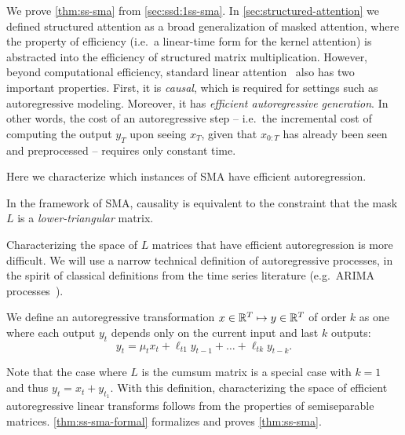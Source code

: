 We prove \cref{thm:ss-sma} from \cref{sec:ssd:1ss-sma}.
In \cref{sec:structured-attention} we defined structured attention as a broad generalization of masked attention,
where the property of efficiency (i.e.\ a linear-time form for the kernel attention) is abstracted into the efficiency of structured matrix multiplication.
However, beyond computational efficiency, standard linear attention~\citep{katharopoulos2020transformers} also has two important properties.
First, it is \emph{causal}, which is required for settings such as autoregressive modeling.
Moreover, it has \emph{efficient autoregressive generation}.
In other words, the cost of an autoregressive step -- i.e.\ the incremental cost of computing the output $y_T$ upon seeing $x_T$, given that $x_{0:T}$ has already been seen and preprocessed --
requires only constant time.

Here we characterize which instances of SMA have efficient autoregression.

In the framework of SMA,
causality is equivalent to the constraint that the mask $L$ is a \emph{lower-triangular} matrix.

Characterizing the space of $L$ matrices that have efficient autoregression is more difficult.
We will use a narrow technical definition of autoregressive processes, in the spirit of classical definitions from the time series literature (e.g.\ ARIMA processes~\citep{box2015time}).%
\begin{definition}
We define an autoregressive transformation $x \in \mathbb{R}^T \mapsto y \in \mathbb{R}^T$ of order $k$ as one where each output $y_t$ depends only on the current input and last $k$ outputs:
\begin{equation}
  \label{eq:efficient-ar}
  y_t = \mu_t x_t + \ell_{t1} y_{t-1} + \dots + \ell_{tk} y_{t-k}.
\end{equation}
\end{definition}
Note that the case where $L$ is the cumsum matrix is a special case with $k=1$ and thus $y_t = x_t + y_{t_1}$.
With this definition, characterizing the space of efficient autoregressive linear transforms follows from the properties of semiseparable matrices.
\cref{thm:ss-sma-formal} formalizes and proves \cref{thm:ss-sma}.

